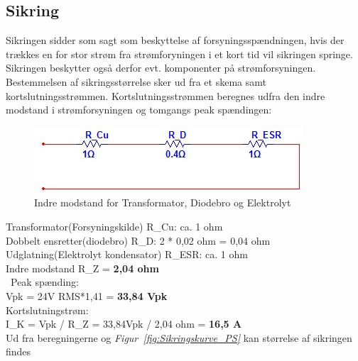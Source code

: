 \subsection{Sikring}
Sikringen sidder som sagt som beskyttelse af forsyningsspændningen, hvis der trækkes en for stor strøm fra strømforyningen i et kort tid vil sikringen springe. Sikringen beskytter også derfor evt. komponenter på strømforsyningen. Bestemmelsen af sikringsstørrelse sker ud fra et skema samt kortslutningsstrømmen. Kortslutningsstrømmen beregnes udfra den indre modstand i strømforsyningen og tomgangs peak spændingen: \\
\begin{figure}[H]
\centering
\includegraphics[scale=0.8]{billeder/Indre_modstand}
\caption{Indre modstand for Transformator, Diodebro og Elektrolyt}
\label{fig:Indre_modstand}
\end{figure}
Transformator(Forsyningskilde) R\_Cu: ca. 1 ohm \\
Dobbelt ensretter(diodebro) R\_D: 2 * 0,02 ohm = 0,04 ohm \\
Udglatning(Elektrolyt kondensator) R\_ESR: ca. 1 ohm \\
Indre modstand R\_Z = \textbf{2,04 ohm}\\ \
Peak spænding:\\
Vpk = 24V RMS*1,41 = \textbf{33,84 Vpk} \\
Kortslutningstrøm:\\
I\_K = Vpk / R\_Z = 33,84Vpk / 2,04 ohm = \textbf{16,5 A} \\
\newpage 
Ud fra beregningerne og \textit{Figur~\ref{fig:Sikringskurve_PS}} kan størrelse af sikringen findes 
